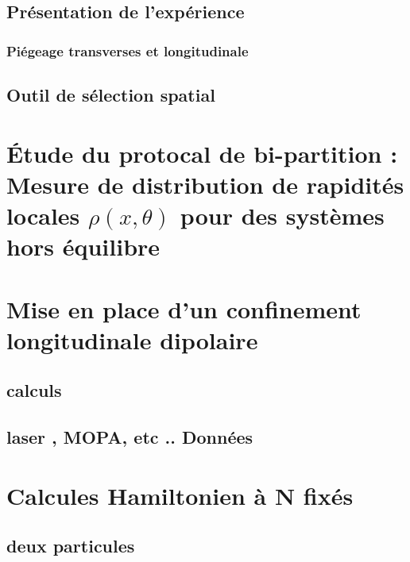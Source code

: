 \section{Présentation de l’expérience}

\subsection{Piégeage transverses et longitudinale}
\section{Outil de sélection spatial}


\chapter{Étude du protocal de bi-partition : Mesure de distribution de rapidités locales $\rho(x , \theta ) $  pour des systèmes hors équilibre}
\minitoc


\chapter{Mise en place d'un confinement longitudinale dipolaire}
\minitoc
\section{calculs}
\section{laser , MOPA, etc .. Données}

\appendix

\chapter{Calcules Hamiltonien à N fixés}
\section{deux particules}\label{annex:2.part}

